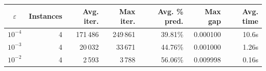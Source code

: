 \begin{tabular}{crrrrrr}
\toprule
$\varepsilon$ & Instances & Avg. iter. & Max iter. & Avg. \% pred. & Max gap & Avg. time \\
\midrule
$10^{-4}$ & 4 & 171\,486 & 249\,861 & 39.81\% & 0.000100 & 10.6s \\
$10^{-3}$ & 4 & 20\,032 & 33\,671 & 44.76\% & 0.001000 & 1.26s \\
$10^{-2}$ & 4 & 2\,593 & 3\,788 & 56.06\% & 0.009998 & 0.16s \\
\bottomrule
\end{tabular}